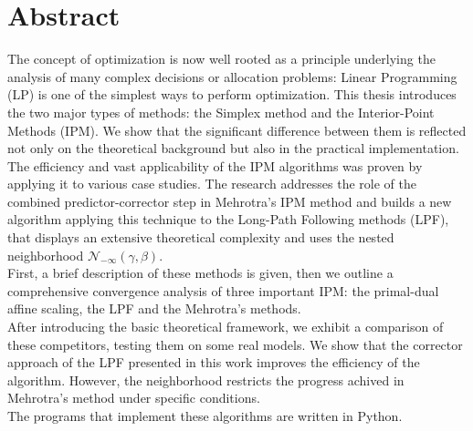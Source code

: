 \documentclass[a4paper,10 pt,titlepage,twoside]{book}
\theoremstyle{plain}
\theoremstyle{definition}
\theoremstyle{remark}
\begin{document}
\chapter*{Abstract}
The concept of optimization is now well rooted as a principle underlying the analysis
of many complex decisions or allocation problems: Linear Programming (LP) is one of the simplest ways to perform optimization.
This thesis introduces the two major types of methods: the Simplex method and the Interior-Point Methods (IPM).
We show that the significant difference between them is reflected not only on the theoretical background but also in the practical implementation.\\
The efficiency and vast applicability of the IPM algorithms was proven by applying it to various case studies.
The research addresses the role of the combined predictor-corrector step in Mehrotra's IPM method and builds  a new algorithm applying this technique to the Long-Path Following methods (LPF), that displays an extensive theoretical complexity and uses the nested neighborhood $\mathcal{N}_{-\infty}(\gamma,\beta)$.\\
First, a brief description of these methods is given,
then we outline a comprehensive convergence analysis of three important IPM: the primal-dual affine scaling, the LPF and the Mehrotra's methods. \\
After introducing the basic theoretical framework, we exhibit a comparison of these competitors, testing them on some real models. We show that the corrector approach of the LPF presented in this work improves the efficiency of the algorithm. However, the 
neighborhood restricts the progress achived in Mehrotra's method under specific conditions.\\
The programs that implement these algorithms are written in Python. 
\end{document}
